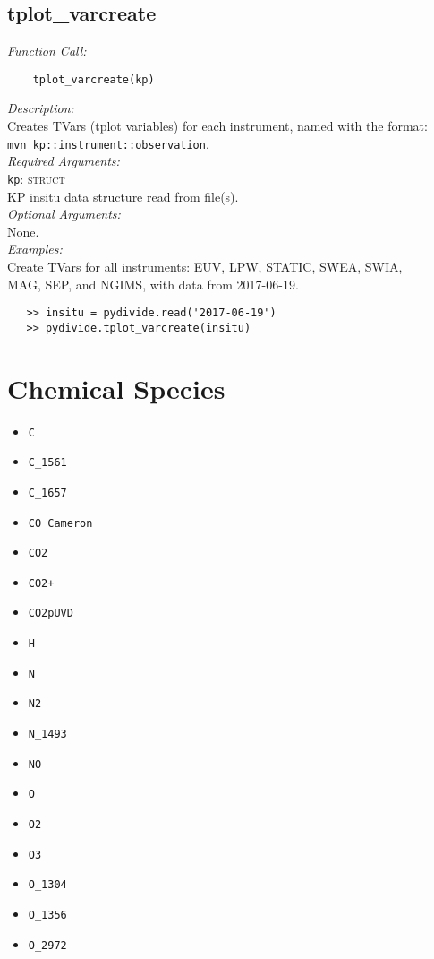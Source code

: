 \documentclass{article}
\begin{document}
\subsection{tplot\_varcreate}
\label{subsec:tplotvarcreate}
\vspace{-5mm}
\textit{Function Call:}\\
\vspace{-10mm}
\begin{verbatim}
    tplot_varcreate(kp)
\end{verbatim}
\vspace{-5mm}
\noindent
\textit{Description:}\\
\indent Creates TVars (tplot variables) for each instrument, named with the format:
\indent \texttt{mvn\_kp::instrument::observation}.\\
\textit{Required Arguments:}\\
\indent \texttt{kp}: \textsc{struct}\\
\indent \indent KP insitu data structure read from file(s).\\ 
\noindent \textit{Optional Arguments:}\\
\indent None.\\
\noindent \textit{Examples:}\\
\indent Create TVars for all instruments: EUV, LPW, STATIC, SWEA, SWIA,\\ 
\indent MAG, SEP, and NGIMS, with data from 2017-06-19.
\vspace{-5mm}
\begin{verbatim}
   >> insitu = pydivide.read('2017-06-19')
   >> pydivide.tplot_varcreate(insitu)
\end{verbatim}

\newpage
\appendix
\section{Chemical Species}
\label{sec:chemicalspecies}
\begin{itemize}
    \item \texttt{C}
    \item \texttt{C\_1561}
    \item \texttt{C\_1657}
    \item \texttt{CO Cameron}
    \item \texttt{CO2}
    \item \texttt{CO2+}
    \item \texttt{CO2pUVD}
    \item \texttt{H}
    \item \texttt{N}
    \item \texttt{N2}
    \item \texttt{N\_1493}
    \item \texttt{NO}
    \item \texttt{O}
    \item \texttt{O2}
    \item \texttt{O3}
    \item \texttt{O\_1304}
    \item \texttt{O\_1356}
    \item \texttt{O\_2972}
\end{itemize}
\end{document}
